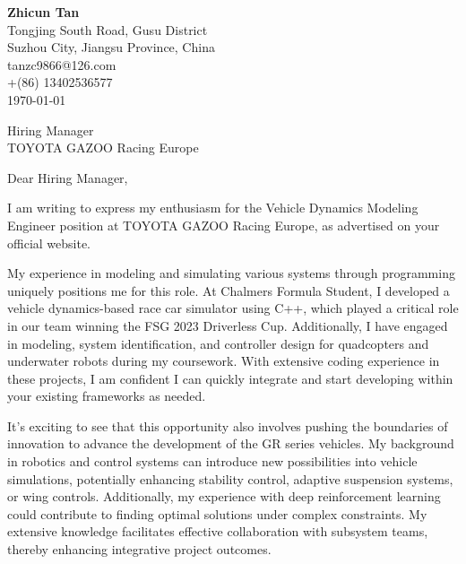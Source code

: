 \documentclass[a4paper,11pt]{article}
\begin{document}
\begin{flushright}
\textbf{Zhicun Tan}\\
Tongjing South Road, Gusu District \\
Suzhou City, Jiangsu Province, China \\
tanzc9866@126.com \\
+(86) 13402536577\\
\today
\end{flushright}

\bigskip

\begin{flushleft}
Hiring Manager \\
TOYOTA GAZOO Racing Europe \\
\end{flushleft}

\bigskip

\begin{flushleft}
Dear Hiring Manager,
\end{flushleft}

\bigskip

I am writing to express my enthusiasm for the Vehicle Dynamics Modeling Engineer position at TOYOTA GAZOO Racing Europe, as advertised on your official website.

\bigskip

My experience in modeling and simulating various systems through programming uniquely positions me for this role. At Chalmers Formula Student, I developed a vehicle dynamics-based race car simulator using C++, which played a critical role in our team winning the FSG 2023 Driverless Cup. Additionally, I have engaged in modeling, system identification, and controller design for quadcopters and underwater robots during my coursework. With extensive coding experience in these projects, I am confident I can quickly integrate and start developing within your existing frameworks as needed.

\bigskip

It's exciting to see that this opportunity also involves pushing the boundaries of innovation to advance the development of the GR series vehicles. My background in robotics and control systems can introduce new possibilities into vehicle simulations, potentially enhancing stability control, adaptive suspension systems, or wing controls. Additionally, my experience with deep reinforcement learning could contribute to finding optimal solutions under complex constraints. My extensive knowledge facilitates effective collaboration with subsystem teams, thereby enhancing integrative project outcomes.
\end{document}
